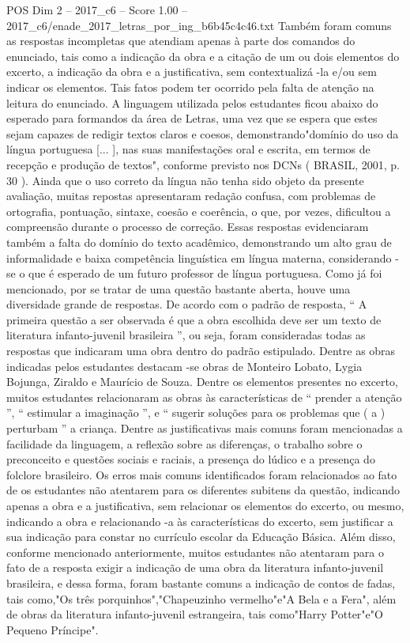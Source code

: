 \begin{textsample}{POS Dim 2 – 2017\_c6 – Score 1.00 – 2017\_c6/enade\_2017\_letras\_por\_ing\_b6b45c4c46.txt}
Também foram comuns as respostas incompletas que atendiam apenas à parte dos comandos do enunciado, tais como a indicação da obra e a citação de um ou dois elementos do excerto, a indicação da obra e a justificativa, sem contextualizá -la e/ou sem indicar os elementos.
Tais fatos podem ter ocorrido pela falta de atenção na leitura do enunciado.
A linguagem utilizada pelos estudantes ficou abaixo do esperado para formandos da área de Letras, uma vez que se espera que estes sejam capazes de redigir textos claros e coesos, demonstrando"domínio do uso da língua portuguesa [... ], nas suas manifestações oral e escrita, em termos de recepção e produção de textos", conforme previsto nos DCNs ( BRASIL, 2001, p. 30 ).
Ainda que o uso correto da língua não tenha sido objeto da presente avaliação, muitas repostas apresentaram redação confusa, com problemas de ortografia, pontuação, sintaxe, coesão e coerência, o que, por vezes, dificultou a compreensão durante o processo de correção.
Essas respostas evidenciaram também a falta do domínio do texto acadêmico, demonstrando um alto grau de informalidade e baixa competência linguística em língua materna, considerando -se o que é esperado de um futuro professor de língua portuguesa.
Como já foi mencionado, por se tratar de uma questão bastante aberta, houve uma diversidade grande de respostas.
De acordo com o padrão de resposta, “ A primeira questão a ser observada é que a obra escolhida deve ser um texto de literatura infanto-juvenil brasileira ”, ou seja, foram consideradas todas as respostas que indicaram uma obra dentro do padrão estipulado.
Dentre as obras indicadas pelos estudantes destacam -se obras de Monteiro Lobato, Lygia Bojunga, Ziraldo e Maurício de Souza.
Dentre os elementos presentes no excerto, muitos estudantes relacionaram as obras às características de “ prender a atenção ”, “ estimular a imaginação ”, e “ sugerir soluções para os problemas que ( a ) perturbam ” a criança.
Dentre as justificativas mais comuns foram mencionadas a facilidade da linguagem, a reflexão sobre as diferenças, o trabalho sobre o preconceito e questões sociais e raciais, a presença do lúdico e a presença do folclore brasileiro.
Os erros mais comuns identificados foram relacionados ao fato de os estudantes não atentarem para os diferentes subitens da questão, indicando apenas a obra e a justificativa, sem relacionar os elementos do excerto, ou mesmo, indicando a obra e relacionando -a às características do excerto, sem justificar a sua indicação para constar no currículo escolar da Educação Básica.
Além disso, conforme mencionado anteriormente, muitos estudantes não atentaram para o fato de a resposta exigir a indicação de uma obra da literatura infanto-juvenil brasileira, e dessa forma, foram bastante comuns a indicação de contos de fadas, tais como,"Os três porquinhos","Chapeuzinho vermelho"e"A Bela e a Fera", além de obras da literatura infanto-juvenil estrangeira, tais como"Harry Potter"e"O Pequeno Príncipe".

\end{textsample}
